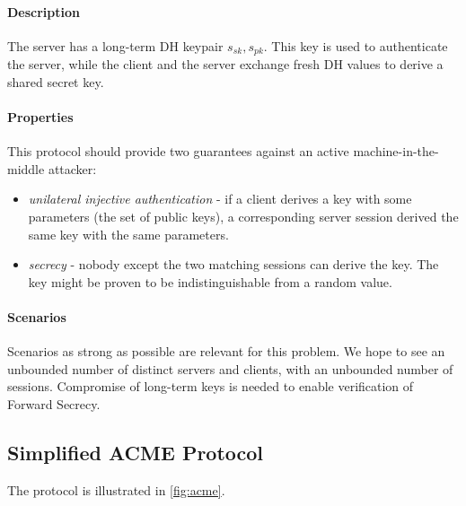 \documentclass[11pt]{article}
\newcommand{\sfsk}{\mathit{sk}}
\newcommand{\sfpk}{\mathit{pk}}
\begin{document}
 \paragraph{Description}The server has a long-term DH keypair $s_\sfsk,s_\sfpk$.
This key is used to authenticate the server, while the client and the server exchange fresh DH values to derive a shared secret key. 

\paragraph{Properties} This protocol should provide two guarantees against an active machine-in-the-middle attacker:
\begin{itemize}
\item \emph{unilateral injective authentication} - if a client derives a key with some parameters (the set of public keys), a corresponding server session derived the same key with the same parameters.
\item \emph{secrecy} - nobody except the two matching sessions can derive the key. The key might be proven to be indistinguishable from a random value.
\end{itemize}

\paragraph{Scenarios} Scenarios as strong as possible are relevant for this problem. We hope to see an unbounded number of distinct servers and clients, with an unbounded number of sessions. Compromise of long-term keys is needed to enable verification of Forward Secrecy.  

\subsection{Simplified ACME Protocol}\label{prob:acme}

The protocol is illustrated in \cref{fig:acme}.
\end{document}
